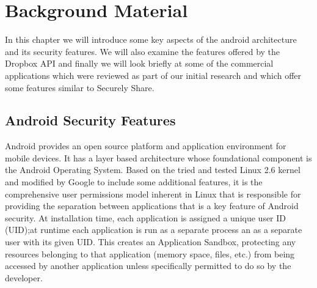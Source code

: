 
\chapter{Background Material}
\label{cha:background}

In this chapter we will introduce some key aspects of the android architecture and its security features.  We will also examine the features offered by the Dropbox API and finally we will look briefly at some of the commercial applications which were reviewed as part of our initial research and which offer some features similar to Securely Share.

\section{Android Security Features}

Android provides an open source platform and application environment for mobile devices.  It has a layer based architecture whose foundational component  is the Android Operating System.  Based on the tried and tested Linux 2.6 kernel and modified by Google to include some additional features, it is the comprehensive user permissions model inherent in Linux that is responsible for providing the separation between applications that is a key feature of Android security.  At installation time, each application is assigned a unique user ID (UID);at runtime each application is run as a separate process an as a separate user with its given UID. This creates an Application Sandbox, protecting any resources belonging to that application (memory space, files, etc.) from being accessed by another application unless specifically permitted to do so by the developer.

